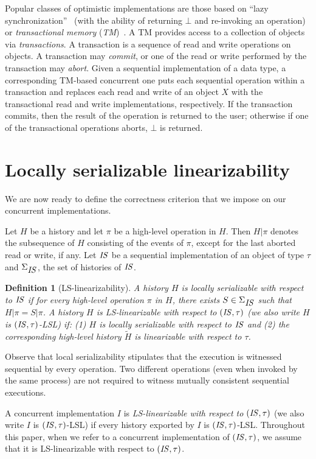 \documentclass[11pt,pdftex,letterpaper]{article}
\newtheorem{definition}[theorem]{Definition}
\newcommand{\LS}{LS}
\newcommand{\id}[1]{\mbox{\textit{#1}}}\newcommand{\res}[1]{\mbox{\textbf{#1}}}
\begin{document}
Popular classes of optimistic implementations are those based on
``lazy synchronization''~\cite{HHL+05,HS08-book} (with the ability of
returning $\bot$ and re-invoking an operation) or   
 \emph{transactional memory} (\emph{TM})~\cite{HM93,ST95,HLR10}.
A TM provides access to a
collection of objects via \emph{transactions}.
A transaction is a sequence of read and write operations on
objects. A transaction may \emph{commit},
or one of the read or write performed by the transaction may \emph{abort}.
Given a sequential implementation of a data type, 
a corresponding TM-based concurrent one 
puts each sequential operation within a
transaction and replaces each read and write of an object $X$ with the
transactional read and write implementations, respectively. 
If the transaction commits, then the result of the operation is
returned to the user; otherwise if one of the transactional operations aborts, $\bot$ is returned.


\section{Locally serializable linearizability}
\label{sec:lin}
We are now ready to define the correctness criterion that we impose on our
concurrent implementations.

Let $H$ be a history and let $\pi$ be a high-level operation in $H$. 
Then $H|\pi$ denotes the subsequence of $H$ consisting of the events
of $\pi$, except for the last aborted read or write, if any.
Let $\id{IS}$ be a sequential implementation of an object of type
$\tau$ and $\Sigma_{\id{IS}}$, the set of histories of $\id{IS}$. 
\begin{definition}[LS-linearizability]
\label{def:lin}
A history ${H}$ is \emph{locally serializable with respect to}
${\id{IS}}$ if for every high-level operation $\pi$ in $H$,
there exists $S \in \Sigma_{\id{IS}}$ such that $H|\pi=S|\pi$.
A history ${H}$ is \emph{\LS-linearizable with respect to
$(\id{IS},\tau)$}  (we also write $H$ is $(\id{IS},\tau)$-LSL)  if:
(1) ${H}$ is locally serializable with respect to
$\id{IS}$ and (2) the corresponding high-level history $\tilde H$ 
is linearizable with respect to $\tau$.
\end{definition}
Observe that local serializability stipulates that the execution is 
witnessed sequential by every operation.
Two different operations (even when invoked by the same process) are not
required to witness mutually consistent sequential executions.

A concurrent implementation $I$ is \emph{\LS-linearizable with respect to
$(\id{IS},\tau)$} (we also write $I$ is $(\id{IS},\tau)$-LSL)
if every history exported by $I$ is $(\id{IS},\tau)$-LSL.   
Throughout this paper, when we refer to a concurrent implementation of $(\id{IS},\tau)$, 
we assume that it is \LS-linearizable with respect to $(\id{IS},\tau)$.
\end{document}

